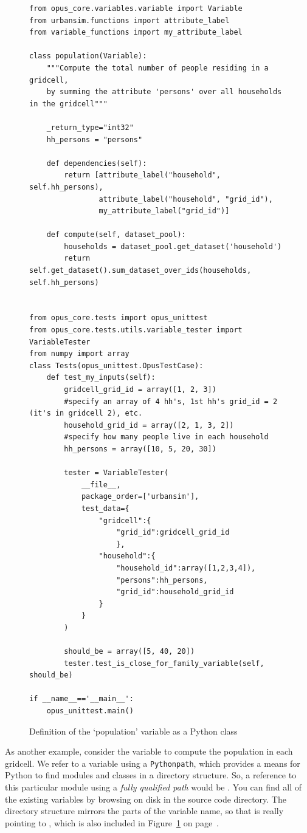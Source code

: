 \begin{figure}[th]
\begin{verbatim}
from opus_core.variables.variable import Variable
from urbansim.functions import attribute_label
from variable_functions import my_attribute_label

class population(Variable):
    """Compute the total number of people residing in a gridcell, 
    by summing the attribute 'persons' over all households in the gridcell"""
    
    _return_type="int32"
    hh_persons = "persons"

    def dependencies(self):
        return [attribute_label("household", self.hh_persons), 
                attribute_label("household", "grid_id"), 
                my_attribute_label("grid_id")]

    def compute(self, dataset_pool):
        households = dataset_pool.get_dataset('household')
        return self.get_dataset().sum_dataset_over_ids(households, self.hh_persons)


from opus_core.tests import opus_unittest
from opus_core.tests.utils.variable_tester import VariableTester
from numpy import array
class Tests(opus_unittest.OpusTestCase):
    def test_my_inputs(self):
        gridcell_grid_id = array([1, 2, 3])
        #specify an array of 4 hh's, 1st hh's grid_id = 2 (it's in gridcell 2), etc.
        household_grid_id = array([2, 1, 3, 2]) 
        #specify how many people live in each household
        hh_persons = array([10, 5, 20, 30])

        tester = VariableTester(
            __file__,
            package_order=['urbansim'],
            test_data={
                "gridcell":{
                    "grid_id":gridcell_grid_id 
                    }, 
                "household":{ 
                    "household_id":array([1,2,3,4]),
                    "persons":hh_persons, 
                    "grid_id":household_grid_id
                }
            }
        )
        
        should_be = array([5, 40, 20])
        tester.test_is_close_for_family_variable(self, should_be)

if __name__=='__main__':
    opus_unittest.main()
\end{verbatim}
\caption{Definition of the `population' variable as a Python class}
\label{fig:population-variable}
\end{figure}

As another example, consider the  variable to compute
the population in each gridcell.  We refer
to a variable using a \verb#Pythonpath#, which provides a means for
Python to find modules and classes in a directory structure.  So, a
reference to this particular module using a \emph{fully qualified path}
would be .  You can find all of the
existing variables by browsing on disk in the source code directory. 
The directory structure mirrors the parts of the variable name, so that
 is really pointing to
, which is also included 
in Figure~\ref{fig:population-variable} on page~\pageref{fig:population-variable}.

